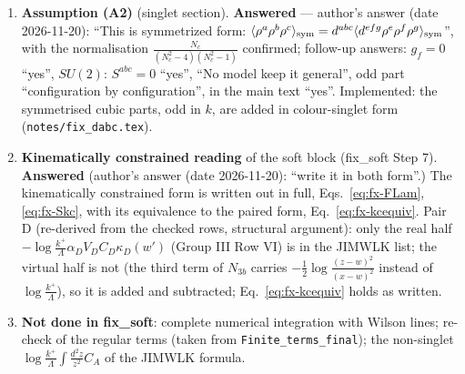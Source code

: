 \documentclass[9pt]{article}
\numberwithin{equation}{section}
\begin{document}
{\begin{enumerate}
\item \textbf{Assumption (A2)} (singlet section). \textbf{Answered} --- author's answer (date 2026-11-20): ``This is symmetrized form: $\langle\rho^{a}\rho^{b}\rho^{c}\rangle_{\rm sym}=d^{abc}\langle d^{efg}\rho^{e}\rho^{f}\rho^{g}\rangle_{\rm sym}$'', with the normalisation $\frac{N_{c}}{(N_{c}^{2}-4)(N_{c}^{2}-1)}$ confirmed; follow-up answers: $g_{f}=0$ ``yes'', $SU(2)$: $S^{abc}=0$ ``yes'', ``No model keep it general'', odd part ``configuration by configuration'', in the main text ``yes''. Implemented: the symmetrised cubic parts, odd in $k$, are added in colour-singlet form (\texttt{notes/fix\_dabc.tex}).
\item \textbf{Kinematically constrained reading} of the soft block (fix\_soft Step 7). \textbf{Answered} (author's answer (date 2026-11-20): ``write it in both form''.) The kinematically constrained form is written out in full, Eqs.~\eqref{eq:fx-FLam}, \eqref{eq:fx-Skc}, with its equivalence to the paired form, Eq.~\eqref{eq:fx-kcequiv}. Pair D (re-derived from the checked rows, structural argument): only the real half $-\log\frac{k^{+}}{\Lambda}\alpha_{D}V_{D}C_{D}\kappa_{D}(w')$ (Group III Row VI) is in the JIMWLK list; the virtual half is not (the third term of $N_{3b}$ carries $-\frac12\log\frac{(z-w)^{2}}{(x-w)^{2}}$ instead of $\log\frac{k^{+}}{\Lambda}$), so it is added and subtracted; Eq.~\eqref{eq:fx-kcequiv} holds as written.
\item \textbf{Not done in fix\_soft}: complete numerical integration with Wilson lines; re-check of the regular terms (taken from \texttt{Finite\_terms\_final}); the non-singlet $\log\frac{k^{+}}{\Lambda}\int\frac{d^{2}z}{z^{2}}C_{A}$ of the JIMWLK formula.
\end{enumerate}}\par
\end{document}
